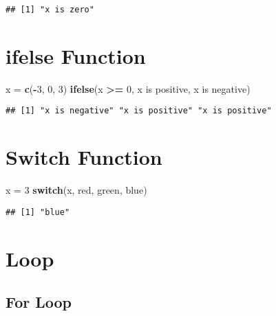 \documentclass[
]{article}
\newenvironment{Shaded}{\begin{snugshade}}{\end{snugshade}}
\newcommand{\ControlFlowTok}[1]{\textcolor[rgb]{0.13,0.29,0.53}{\textbf{#1}}}
\newcommand{\DecValTok}[1]{\textcolor[rgb]{0.00,0.00,0.81}{#1}}
\newcommand{\FunctionTok}[1]{\textcolor[rgb]{0.13,0.29,0.53}{\textbf{#1}}}
\newcommand{\NormalTok}[1]{#1}
\newcommand{\OtherTok}[1]{\textcolor[rgb]{0.56,0.35,0.01}{#1}}
\newcommand{\SpecialCharTok}[1]{\textcolor[rgb]{0.81,0.36,0.00}{\textbf{#1}}}
\newcommand{\StringTok}[1]{\textcolor[rgb]{0.31,0.60,0.02}{#1}}
\begin{document}
\begin{verbatim}
## [1] "x is zero"
\end{verbatim}

\section{ifelse Function}\label{ifelse-function}

\begin{Shaded}
\begin{Highlighting}[]
\NormalTok{x }\OtherTok{=} \FunctionTok{c}\NormalTok{(}\SpecialCharTok{{-}}\DecValTok{3}\NormalTok{, }\DecValTok{0}\NormalTok{, }\DecValTok{3}\NormalTok{)}
\FunctionTok{ifelse}\NormalTok{(x }\SpecialCharTok{\textgreater{}=} \DecValTok{0}\NormalTok{, }\StringTok{\textquotesingle{}x is positive\textquotesingle{}}\NormalTok{, }\StringTok{\textquotesingle{}x is negative\textquotesingle{}}\NormalTok{)}
\end{Highlighting}
\end{Shaded}

\begin{verbatim}
## [1] "x is negative" "x is positive" "x is positive"
\end{verbatim}

\section{Switch Function}\label{switch-function}

\begin{Shaded}
\begin{Highlighting}[]
\NormalTok{x }\OtherTok{=} \DecValTok{3}
\ControlFlowTok{switch}\NormalTok{(x, }\StringTok{\textquotesingle{}red\textquotesingle{}}\NormalTok{, }\StringTok{\textquotesingle{}green\textquotesingle{}}\NormalTok{, }\StringTok{\textquotesingle{}blue\textquotesingle{}}\NormalTok{)}
\end{Highlighting}
\end{Shaded}

\begin{verbatim}
## [1] "blue"
\end{verbatim}

\section{Loop}\label{loop}

\subsection{For Loop}\label{for-loop}
\end{document}
